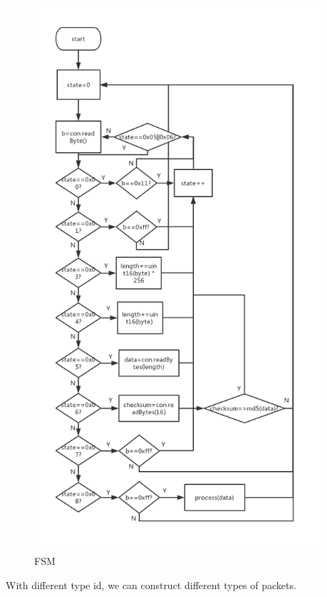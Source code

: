 \documentclass{article}
\begin{document}
 \begin{figure}[H]
     \centering
     \includegraphics[width=0.95\textwidth]{protocolflowchart}
     \caption{FSM}
     \label{fig:protocolflowchart}
 \end{figure}

 With different type id, we can construct different types of packets.
\end{document}
